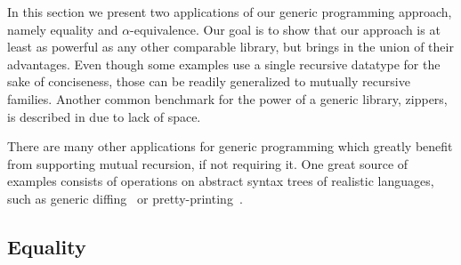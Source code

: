 \documentclass[screen,sigplan]{acmart}%
\begin{document}
In this section we present two applications of our generic programming
approach, namely equality and $\alpha$-equivalence. Our goal
is to show that our approach is at least as powerful as any other comparable
library, but brings in the union of their advantages. 
Even though some examples use a single recursive
datatype for the sake of conciseness, those can be readily generalized to
mutually recursive families. Another common benchmark for the power of
a generic library, zippers, is described in  due to lack
of space.

There are many other applications for generic programming which
greatly benefit from supporting mutual recursion, if not requiring it.
One great source of examples consists of operations on abstract syntax
trees of realistic languages, such as generic
diffing~\cite{CacciariMiraldo2017} or
pretty-printing~\cite{Magalhaes2010}.

\subsection{Equality}
\end{document}
